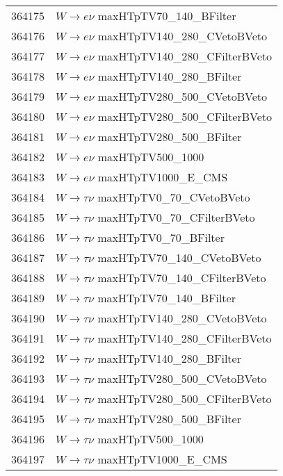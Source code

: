 \documentclass[12pt, a4paper]{book}
\begin{document}
\begin{table}[!h]
\begin{tabular}{c|l}
        364175                  & $W\rightarrow e\nu$ maxHTpTV70\_140\_BFilter\\
        364176                  & $W\rightarrow e\nu$ maxHTpTV140\_280\_CVetoBVeto\\
        364177                  & $W\rightarrow e\nu$ maxHTpTV140\_280\_CFilterBVeto\\
        364178                  & $W\rightarrow e\nu$ maxHTpTV140\_280\_BFilter\\
        364179                  & $W\rightarrow e\nu$ maxHTpTV280\_500\_CVetoBVeto\\
        364180                  & $W\rightarrow e\nu$ maxHTpTV280\_500\_CFilterBVeto\\
        364181                  & $W\rightarrow e\nu$ maxHTpTV280\_500\_BFilter\\
        364182                  & $W\rightarrow e\nu$ maxHTpTV500\_1000\\
        364183                  & $W\rightarrow e\nu$ maxHTpTV1000\_E\_CMS\\
        364184                  & $W\rightarrow \tau\nu$ maxHTpTV0\_70\_CVetoBVeto\\
        364185                  & $W\rightarrow \tau\nu$ maxHTpTV0\_70\_CFilterBVeto\\
        364186                  & $W\rightarrow \tau\nu$ maxHTpTV0\_70\_BFilter\\
        364187                  & $W\rightarrow \tau\nu$ maxHTpTV70\_140\_CVetoBVeto\\
        364188                  & $W\rightarrow \tau\nu$ maxHTpTV70\_140\_CFilterBVeto\\
        364189                  & $W\rightarrow \tau\nu$ maxHTpTV70\_140\_BFilter\\
        364190                  & $W\rightarrow \tau\nu$ maxHTpTV140\_280\_CVetoBVeto\\
        364191                  & $W\rightarrow \tau\nu$ maxHTpTV140\_280\_CFilterBVeto\\
        364192                  & $W\rightarrow \tau\nu$ maxHTpTV140\_280\_BFilter\\
        364193                  & $W\rightarrow \tau\nu$ maxHTpTV280\_500\_CVetoBVeto\\
        364194                  & $W\rightarrow \tau\nu$ maxHTpTV280\_500\_CFilterBVeto\\
        364195                  & $W\rightarrow \tau\nu$ maxHTpTV280\_500\_BFilter\\
        364196                  & $W\rightarrow \tau\nu$ maxHTpTV500\_1000\\
        364197                  & $W\rightarrow \tau\nu$ maxHTpTV1000\_E\_CMS\\
        \midrule\midrule
    \end{tabular}
    \label{tab:W_DSID}
\end{table}
\end{document}
